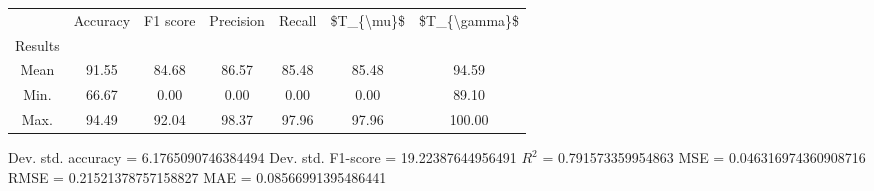 \begin{tabular}{|c|c|c|c|c|c|c|}
\toprule
{} &  Accuracy &  F1 score &  Precision &  Recall &  \$T\_\{\textbackslash mu\}\$ &  \$T\_\{\textbackslash gamma\}\$ \\
Results &           &           &            &         &            &               \\
\hline
Mean    &     91.55 &     84.68 &      86.57 &   85.48 &      85.48 &         94.59 \\
Min.    &     66.67 &      0.00 &       0.00 &    0.00 &       0.00 &         89.10 \\
Max.    &     94.49 &     92.04 &      98.37 &   97.96 &      97.96 &        100.00 \\
\bottomrule
\end{tabular}

 Dev. std. accuracy = 6.1765090746384494
 Dev. std. F1-score = 19.22387644956491
 $R^2$ = 0.791573359954863
 MSE = 0.046316974360908716
 RMSE = 0.21521378757158827
 MAE = 0.08566991395486441